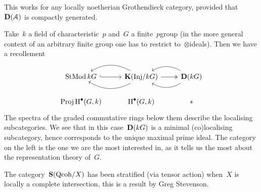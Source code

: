 \documentclass[10pt,a4paper]{article}
\begin{document}
\begin{remark}
  This works for any locally noetherian Grothendieck category, provided that~$\mathbf{D}(\mathcal{A})$ is compactly generated.
\end{remark}

\begin{example}
  Take~$k$ a field of characteristic~$p$ and~$G$ a finite~$p$\dash group (in the more general context of an arbitrary finite group one has to restrict to~$\otimes$\dash ideals). Then we have a recollement
  \begin{equation}
    \begin{tikzcd}
      \StMod kG \arrow[hook]{r} & \KKK(\Inj/kG) \arrow[bend right, swap]{l} \arrow[bend left]{l} \arrow[two heads]{r} & \derived(kG) \arrow[bend right, swap]{l} \arrow[bend left]{l} \\
      \Proj\HH^\bullet(G,k) & \HH^\bullet(G,k) & *
    \end{tikzcd}
  \end{equation}
  The spectra of the graded commutative rings below them describe the localising subcategories. We see that in this case~$\mathbf{D}(kG)$ is a minimal (co)localising subcategory, hence corresponds to the unique maximal prime ideal. The category on the left is the one we are the most interested in, as it tells us the most about the representation theory of~$G$.
\end{example}

\begin{example}
  The category~$\operatorname{\mathbf{S}}(\mathrm{Qcoh}/X)$ has been stratified (via tensor action) when~$X$ is locally a complete intersection, this is a result by Greg Stevenson.
\end{example}
\end{document}
